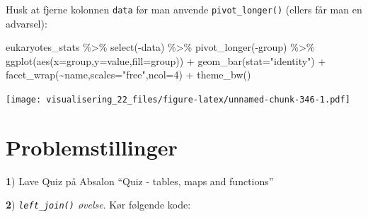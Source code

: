\documentclass[
]{book}
\newenvironment{Shaded}{\begin{snugshade}}{\end{snugshade}}
\newcommand{\AttributeTok}[1]{\textcolor[rgb]{0.77,0.63,0.00}{#1}}
\newcommand{\DecValTok}[1]{\textcolor[rgb]{0.00,0.00,0.81}{#1}}
\newcommand{\FunctionTok}[1]{\textcolor[rgb]{0.00,0.00,0.00}{#1}}
\newcommand{\NormalTok}[1]{#1}
\newcommand{\SpecialCharTok}[1]{\textcolor[rgb]{0.00,0.00,0.00}{#1}}
\newcommand{\StringTok}[1]{\textcolor[rgb]{0.31,0.60,0.02}{#1}}
\begin{document}
Husk at fjerne kolonnen \texttt{data} før man anvende \texttt{pivot\_longer()} (ellers får man en advarsel):

\begin{Shaded}
\begin{Highlighting}[]
\NormalTok{eukaryotes\_stats }\SpecialCharTok{\%\textgreater{}\%} 
  \FunctionTok{select}\NormalTok{(}\SpecialCharTok{{-}}\NormalTok{data) }\SpecialCharTok{\%\textgreater{}\%}
  \FunctionTok{pivot\_longer}\NormalTok{(}\SpecialCharTok{{-}}\NormalTok{group) }\SpecialCharTok{\%\textgreater{}\%}
  \FunctionTok{ggplot}\NormalTok{(}\FunctionTok{aes}\NormalTok{(}\AttributeTok{x=}\NormalTok{group,}\AttributeTok{y=}\NormalTok{value,}\AttributeTok{fill=}\NormalTok{group)) }\SpecialCharTok{+} 
  \FunctionTok{geom\_bar}\NormalTok{(}\AttributeTok{stat=}\StringTok{"identity"}\NormalTok{) }\SpecialCharTok{+} 
  \FunctionTok{facet\_wrap}\NormalTok{(}\SpecialCharTok{\textasciitilde{}}\NormalTok{name,}\AttributeTok{scales=}\StringTok{"free"}\NormalTok{,}\AttributeTok{ncol=}\DecValTok{4}\NormalTok{) }\SpecialCharTok{+} 
  \FunctionTok{theme\_bw}\NormalTok{()}
\end{Highlighting}
\end{Shaded}

\texttt{[image: visualisering\_22\_files/figure-latex/unnamed-chunk-346-1.pdf]}

\hypertarget{problemstillinger-6}{%
\section{Problemstillinger}\label{problemstillinger-6}}

\textbf{1}) Lave Quiz på Absalon ``Quiz - tables, maps and functions''

\textbf{2}) \emph{\texttt{left\_join()} øvelse}. Kør følgende kode:
\end{document}
